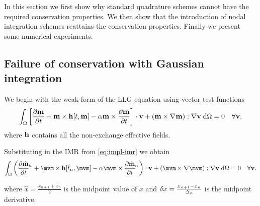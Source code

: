 In this section we first show why standard quadrature schemes cannot have the required conservation properties.
We then show that the introduction of nodal integration schemes reattains the conservation properties.
Finally we present some numerical experiments.


\subsection{Failure of conservation with Gaussian integration}

\newcommand{\midpoint}[1]{\hat{#1}}
\newsubcommand{\mvm}{\midpoint{\mv}}{n}
\newcommand{\tm}{\midpoint{t}_n}
\newcommand{\dtop}{\delta}
\newcommand{\pdsub}[3]{\mathrlap{\pd{#1\mathrlap{_{#2}}}{#3}}\phantom{\pd{#1_{#2}}{#3}}}
\newcommand{\dmdtm}{\pdsub{\midpoint{\mv}}{n}{t}}
\newcommand{\dmdtml}{\pdsub{\midpoint{\mv}}{n,l}{t}}
\newcommand{\dmdtmj}{\pdsub{\midpoint{\mv}}{n,j}{t}}

\newcommand{\ipg}[2]{\intd{{#1} \cdot {#2}}}

We begin with the weak form of the LLG equation using vector test functions
\begin{equation}
  \label{eq:weak-llg}
  {\int_{\Omega}  {\left[ \frac{\partial \mathbf{m}}{\partial t}+ \mathbf{m}\times \mathbf{h}[t, \mathbf{m}] - \alpha\mathbf{m}\times \frac{\partial \mathbf{m}}{\partial t}\right]} \cdot \mathbf{v}+ {\left( \mathbf{m}\times \nabla\mathbf{m}\right)} : \nabla\mathbf{v}{\; \text{d}}{\Omega}} = 0 \quad \forall \mathbf{v},
\end{equation}
where $\mathbf{h}$ contains all the non-exchange effective fields.


Substituting in the IMR from \cref{eq:impl-imr} we obtain
\begin{equation}
  \label{eq:weak-llg-imr}
  \intd{\bigb{\dmdtm + \mvm \times \hv[\tm, \mvm] - \dampc \mvm \times \dmdtm} \cdot \testv
  + \bigb{\mvm \times \grad \mvm} : \grad \testv} = 0 \quad \forall \testv.
\end{equation}

where $\midpoint{x} = \frac{x_{n+1} + x_{n}}{2}$ is the midpoint value of $x$ and $\dtop x = \frac{x_{n+1} - x_n}{\dtn}$ is the midpoint derivative.

